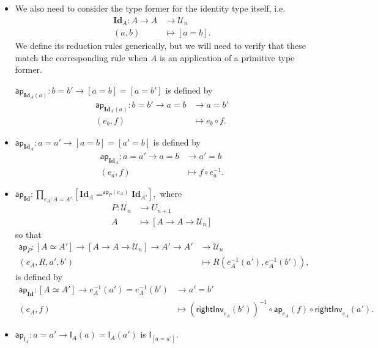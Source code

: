 \documentclass[a4paper]{article}
\theoremstyle{definition}
\theoremstyle{remark}
\renewcommand{\equiv}{\simeq}
\newcommand{\pathOver}[1]{=^{#1}}
\newcommand{\univVar}{\mathcal}
\newcommand{\U}{\univVar{U}}
\newcommand{\primType}{\mathbf}
\newcommand{\0}{\primType{0}}
\newcommand{\1}{\primType{1}}
\newcommand{\2}{\primType{2}}
\newcommand{\Id}{\primType{Id}}
\newcommand{\nm}{\mathsf}
\newcommand{\ap}{\nm{ap}}
\newcommand{\combinator}{\nm}
\newcommand{\idFun}{\combinator{I}}
\newcommand{\rightInv}{\nm{rightInv}}
\begin{document}
\begin{itemize}
  \item We also need to consider the type former for the identity type itself, i.e.
  \begin{align*}
    \Id_A : A \to A &\to     \U_n\\
            (a,b)   &\mapsto [a = b].
  \end{align*}
  We define its reduction rules generically, but we will need to verify that these match the
  corresponding rule when $A$ is an application of a primitive type former.

  $\ap_{\Id_A(a)} : b = b' \to [a = b] = [a = b']$ is defined by
  \begin{align*}
    \ap_{\Id_A(a)} : b = b' \to a = b &\to     a = b'\\
                     (e_b,f)          &\mapsto e_b \circ f.
  \end{align*}

  \item $\ap_{\Id_A} : a = a' \to [a = b] = [a' = b]$ is defined by
  \begin{align*}
    \ap_{\Id_A} : a = a' \to a = b &\to     a' = b\\
                  (e_a,f)          &\mapsto f \circ e_a^{-1}.
  \end{align*}

  \item $\ap_\Id : \prod_{e_A : A = A'} [\Id_A \pathOver{\ap_P(e_A)} \Id_{A'}],$ where
  \begin{align*}
    P : \U_n &\to     U_{n+1}\\
        A    &\mapsto [A \to A \to \U_n]
  \end{align*}
  so that
  \begin{align*}
    \ap_P : [A \equiv A'] \to [A \to A \to \U_n] \to A' \to A' &\to     \U_n\\
            (e_A,R,a',b')                                      &\mapsto R(e_A^{-1}(a'),e_A^{-1}(b')),
  \end{align*}
  is defined by
  \begin{align*}
    \ap_\Id : [A \equiv A'] \to e_A^{-1}(a') = e_A^{-1}(b') &\to     a' = b'\\
              (e_A,f)                                       &\mapsto (\rightInv_{e_A}(b'))^{-1} \circ \ap_{e_A}(f) \circ \rightInv_{e_A}(a').
  \end{align*}

  \item $\ap_{\idFun_A} : a = a' \to \idFun_A(a) = \idFun_A(a')$ is $\idFun_{[a = a']}.$


\end{itemize}
\end{document}
